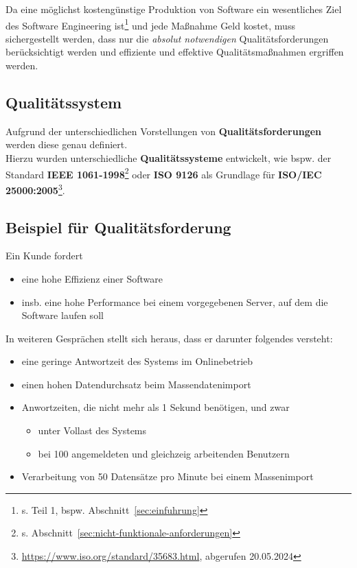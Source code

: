 \noindent
Da eine möglichst kostengünstige Produktion von Software ein wesentliches Ziel des Software Engineering ist\footnote{
s. Teil 1, bspw. Abschnitt~\ref{sec:einfuhrung}
} und jede Maßnahme Geld kostet, muss sichergestellt werden, dass nur die \textit{absolut notwendigen} Qualitätsforderungen berücksichtigt werden und effiziente und effektive Qualitätsmaßnahmen ergriffen werden.

\subsection*{Qualitätssystem}
Aufgrund der unterschiedlichen Vorstellungen von \textbf{Qualitätsforderungen} werden diese genau definiert.\\
Hierzu wurden unterschiedliche \textbf{Qualitätssysteme} entwickelt, wie bspw. der Standard \textbf{IEEE 1061-1998}\footnote{s. Abschnitt~\ref{sec:nicht-funktionale-anforderungen}} oder \textbf{ISO 9126} als Grundlage für \textbf{ISO/IEC 25000:2005}\footnote{
    \url{https://www.iso.org/standard/35683.html}, abgerufen 20.05.2024
}.

\subsection*{Beispiel für Qualitätsforderung}
Ein Kunde fordert
\begin{itemize}
    \item eine hohe Effizienz einer Software
    \item insb. eine hohe Performance bei einem vorgegebenen Server, auf dem die Software laufen soll
\end{itemize}

\noindent
In weiteren Gesprächen stellt sich heraus, dass er darunter folgendes versteht:

\begin{itemize}
    \item eine geringe Antwortzeit des Systems im Onlinebetrieb
    \item einen hohen Datendurchsatz beim Massendatenimport
    \item Anwortzeiten, die nicht mehr als 1 Sekund benötigen, und zwar
        \begin{itemize}
            \item unter Vollast des Systems
            \item bei 100 angemeldeten und gleichzeig arbeitenden Benutzern
        \end{itemize}
    \item Verarbeitung von 50 Datensätze pro Minute bei einem Massenimport
\end{itemize}

